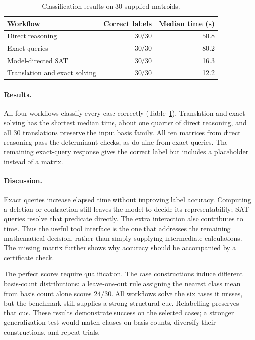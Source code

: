 \documentclass[11pt,letterpaper,titlepage]{article}
\begin{document}
\begin{table}[!htbp]
\centering
\caption{Classification results on 30 supplied matroids.}
\label{tab:classification}
\begin{tabular}{@{}lrr@{}}
\toprule
Workflow & Correct labels & Median time (s) \\
\midrule
Direct reasoning & \(30/30\) & 50.8 \\
Exact queries & \(30/30\) & 80.2 \\
Model-directed SAT & \(30/30\) & 16.3 \\
Translation and exact solving & \(30/30\) & 12.2 \\
\bottomrule
\end{tabular}
\end{table}

\paragraph{Results.}
All four workflows classify every case correctly (Table~\ref{tab:classification}). Translation and exact solving has the shortest median time, about one quarter of direct reasoning, and all 30 translations preserve the input basis family. All ten matrices from direct reasoning pass the determinant checks, as do nine from exact queries. The remaining exact-query response gives the correct label but includes a placeholder instead of a matrix.

\paragraph{Discussion.}
Exact queries increase elapsed time without improving label accuracy. Computing a deletion or contraction still leaves the model to decide its representability; SAT queries resolve that predicate directly. The extra interaction also contributes to time. Thus the useful tool interface is the one that addresses the remaining mathematical decision, rather than simply supplying intermediate calculations. The missing matrix further shows why accuracy should be accompanied by a certificate check.

The perfect scores require qualification. The case constructions induce different basis-count distributions: a leave-one-out rule assigning the nearest class mean from basis count alone scores \(24/30\). All workflows solve the six cases it misses, but the benchmark still supplies a strong structural cue. Relabelling preserves that cue. These results demonstrate success on the selected cases; a stronger generalization test would match classes on basis counts, diversify their constructions, and repeat trials.
\end{document}
